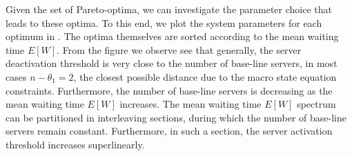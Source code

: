 Given the set of Pareto-optima, we can investigate the parameter choice that leads to these optima.
To this end, we plot the system parameters for each optimum in .
The optima themselves are sorted according to the mean waiting time \(E[W]\).
From the figure we observe see that generally, the server deactivation threshold is very close to the number of base-line servers, in most cases \(n - \theta_1 = 2\), the closest possible distance due to the macro state equation constraints.
Furthermore, the number of base-line servers is decreasing as the mean waiting time \(E[W]\) increases.
The mean waiting time \(E[W]\) spectrum can be partitioned in interleaving sections, during which the number of base-line servers remain constant.
Furthermore, in such a section, the server activation threshold increases superlinearly.
